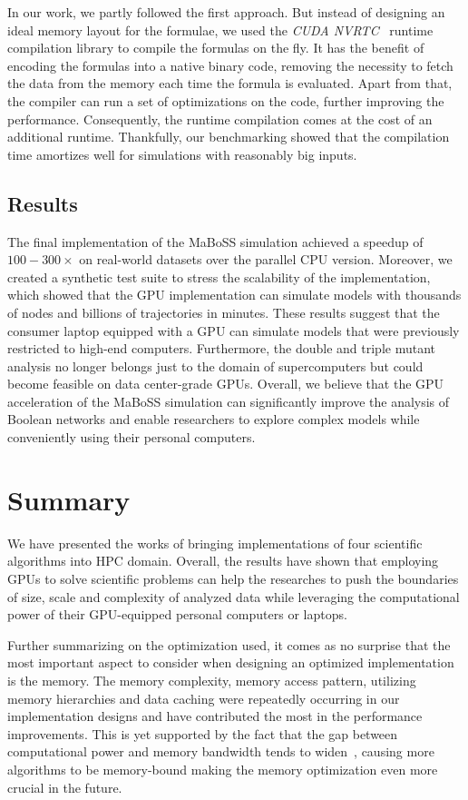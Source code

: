 In our work, we partly followed the first approach. But instead of designing an ideal memory layout for the formulae, we used the \emph{CUDA NVRTC}~\cite{nvrtc-online} runtime compilation library to compile the formulas on the fly. It has the benefit of encoding the formulas into a native binary code, removing the necessity to fetch the data from the memory each time the formula is evaluated. Apart from that, the compiler can run a set of optimizations on the code, further improving the performance. Consequently, the runtime compilation comes at the cost of an additional runtime. Thankfully, our benchmarking showed that the compilation time amortizes well for simulations with reasonably big inputs.

\subsection{Results}

The final implementation of the MaBoSS simulation achieved a speedup of $100-300\times$ on real-world datasets over the parallel CPU version. Moreover, we created a synthetic test suite to stress the scalability of the implementation, which showed that the GPU implementation can simulate models with thousands of nodes and billions of trajectories in minutes. These results suggest that the consumer laptop equipped with a GPU can simulate models that were previously restricted to high-end computers. Furthermore, the double and triple mutant analysis no longer belongs just to the domain of supercomputers but could become feasible on data center-grade GPUs. Overall, we believe that the GPU acceleration of the MaBoSS simulation can significantly improve the analysis of Boolean networks and enable researchers to explore complex models while conveniently using their personal computers.

\section{Summary}

We have presented the works of bringing implementations of four scientific algorithms into HPC domain. Overall, the results have shown that employing GPUs to solve scientific problems can help the researches to push the boundaries of size, scale and complexity of analyzed data while leveraging the computational power of their GPU-equipped personal computers or laptops.

Further summarizing on the optimization used, it comes as no surprise that the most important aspect to consider when designing an optimized implementation is the memory. The memory complexity, memory access pattern, utilizing memory hierarchies and data caching were repeatedly occurring in our implementation designs and have contributed the most in the performance improvements. This is yet supported by the fact that the gap between computational power and memory bandwidth tends to widen~\cite{zhang2023perks}, causing more algorithms to be memory-bound making the memory optimization even more crucial in the future.


